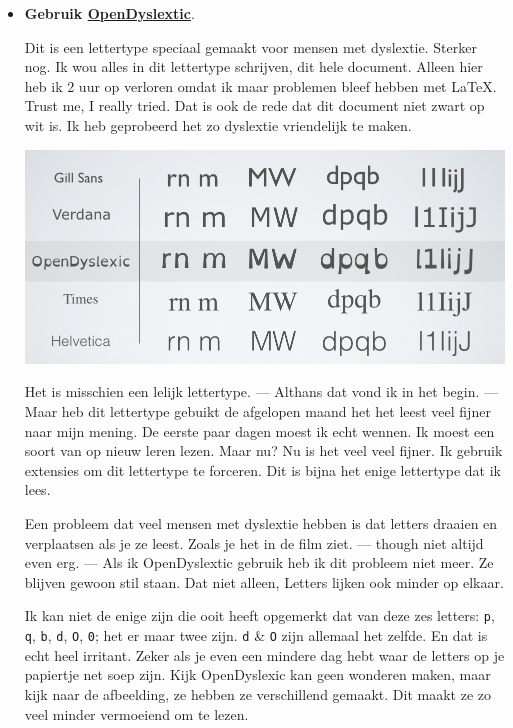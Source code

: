 \documentclass{article}
\begin{document}
                    \begin{itemize}
                        
                        \item \textbf{Gebruik \hyperlink{https://opendyslexic.org/}{OpenDyslextic}}. 
                            
                            Dit is een lettertype speciaal gemaakt voor mensen met dyslextie. Sterker nog. Ik wou alles in dit lettertype schrijven, dit hele document. Alleen hier heb ik 2 uur op verloren omdat ik maar problemen bleef hebben met \LaTeX. Trust me, I really tried. Dat is ook de rede dat dit document niet zwart op wit is. Ik heb geprobeerd het zo dyslextie vriendelijk te maken. 

                            \begin{center}
                                \includegraphics[width=35em]{open-dyslexic-abelardo-gonzalez-font-character-map.png}
                            \end{center}

                            Het is misschien een lelijk lettertype. — Althans dat vond ik in het begin. — Maar heb dit lettertype gebuikt de afgelopen maand het het leest veel fijner naar mijn mening. De eerste paar dagen moest ik echt wennen. Ik moest een soort van op nieuw leren lezen. Maar nu? Nu is het veel veel fijner. Ik gebruik extensies om dit lettertype te forceren. Dit is bijna het enige lettertype dat ik lees.

                            Een probleem dat veel mensen met dyslextie hebben is dat letters draaien en verplaatsen als je ze leest. Zoals je het in de film ziet. — though niet altijd even erg. — Als ik OpenDyslextic gebruik heb ik dit probleem niet meer. Ze blijven gewoon stil staan. Dat niet alleen, Letters lijken ook minder op elkaar.

                            Ik kan niet de enige zijn die ooit heeft opgemerkt dat van deze zes letters: \texttt{p}, \texttt{q}, \texttt{b}, \texttt{d}, \texttt{O}, \texttt{0}; het er maar twee zijn. \texttt{d} \& \texttt{O} zijn allemaal het zelfde. En dat is echt heel irritant. Zeker als je even een mindere dag hebt waar de letters op je papiertje net soep zijn. Kijk OpenDyslexic kan geen wonderen maken, maar kijk naar de afbeelding, ze hebben ze verschillend gemaakt. Dit maakt ze zo veel minder vermoeiend om te lezen.


\end{itemize}
\end{document}
